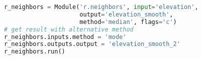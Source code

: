 \documentclass{standalone}
\begin{document}
\begin{lstlisting}[language=Python,linewidth=34.2em]
r_neighbors = Module('r.neighbors', input='elevation',
                     output='elevation_smooth',
                     method='median', flags='c')
# get result with alternative method
r_neighbors.inputs.method = 'mode'
r_neighbors.outputs.output = 'elevation_smooth_2'
r_neighbors.run()
\end{lstlisting}
\end{document}
